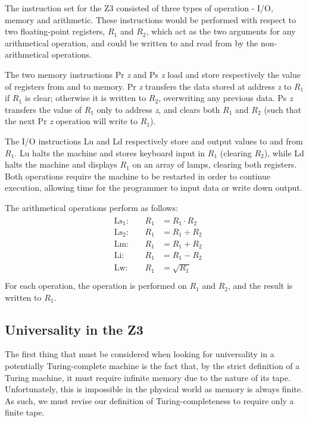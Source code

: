 \documentclass[Master.tex]{subfiles}
\begin{document}
The instruction set for the Z3 consisted of three types of operation - I/O, memory and arithmetic. These instructions would be performed with respect to two floating-point registers, $R_1$ and $R_2$, which act as the two arguments for any arithmetical operation, and could be written to and read from by the non-arithmetical operations. 

The two memory instructions Pr \textit{z} and Ps \textit{z} load and store respectively the value of registers from and to memory. Pr \textit{z} transfers the data stored at address \textit{z} to $R_1$ if $R_1$ is clear; otherwise it is written to $R_2$, overwriting any previous data. Ps \textit{z} transfers the value of $R_1$ only to address \textit{z}, and clears both $R_1$ and $R_2$ (such that the next Pr \textit{z} operation will write to $R_1$). 

The I/O instructions Lu and Ld respectively store and output values to and from $R_1$. Lu halts the machine and stores keyboard input in $R_1$ (clearing $R_2$), while Ld halts the machine and displays $R_1$ on an array of lamps, clearing both registers. Both operations require the machine to be restarted in order to continue execution, allowing time for the programmer to input data or write down output.

The arithmetical operations perform as follows:
\begin{gather*}
\begin{aligned}
&\mathrm{Ls_1}:\quad	&R_1 &= R_1 \cdot R_2 \\
&\mathrm{Ls_2}:\quad	&R_1 &= R_1 \div R_2 \\
&\mathrm{Lm}:\quad	&R_1 &= R_1 + R_2 \\
&\mathrm{Li}:\quad	&R_1 &= R_1 - R_2 \\
&\mathrm{Lw}:\quad	&R_1 &= \sqrt{R_1} \\
\end{aligned}
\end{gather*}
For each operation, the operation is performed on $R_1$ and $R_2$, and the result is written to $R_1$. 
\subsection{Universality in the Z3}

The first thing that must be considered when looking for universality in a potentially Turing-complete machine is the fact that, by the strict definition of a Turing machine, it must require infinite memory due to the nature of its tape. Unfortunately, this is impossible in the physical world as memory is always finite. As such, we must revise our definition of Turing-completeness to require only a finite tape.
\end{document}
